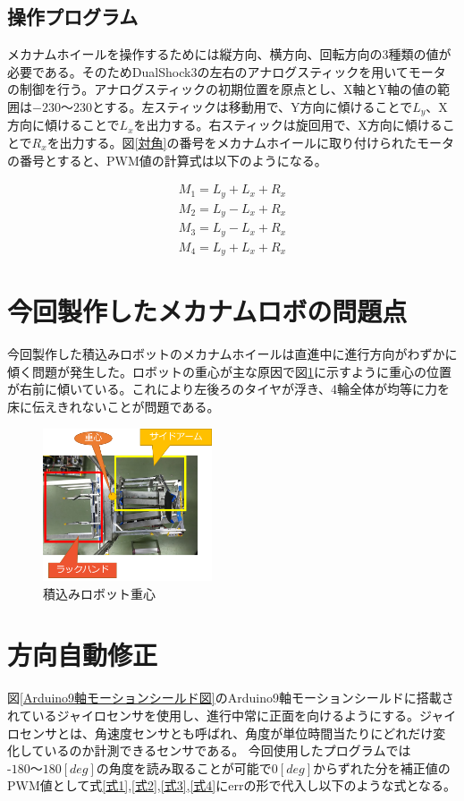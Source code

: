 \documentclass[twocolumn,11pt]{sotsuken_abst}
\begin{document}
	\subsection{操作プログラム}
	メカナムホイールを操作するためには縦方向、横方向、回転方向の3種類の値が必要である。そのためDualShock3の左右のアナログスティックを用いてモータの制御を行う。アナログスティックの初期位置を原点とし、X軸とY軸の値の範囲は$-230～230$とする。左スティックは移動用で、Y方向に傾けることで$L_y$、X方向に傾けることで$L_x$を出力する。右スティックは旋回用で、X方向に傾けることで$R_x$を出力する。図\ref{対角}の番号をメカナムホイールに取り付けられたモータの番号とすると、PWM値の計算式は以下のようになる。

	\begin{eqnarray}
	M_1 = L_y + L_x + R_x
	\label{式1}
	\\
	M_2 = L_y - L_x + R_x
	\label{式2}
	\\
	M_3 = L_y - L_x + R_x
	\label{式3}
	\\
	M_4 = L_y + L_x + R_x
	\label{式4}
	\end{eqnarray}

\section{今回製作したメカナムロボの問題点}
今回製作した積込みロボットのメカナムホイールは直進中に進行方向がわずかに傾く問題が発生した。ロボットの重心が主な原因で図\ref{積込みロボット重心}に示すように重心の位置が右前に傾いている。これにより左後ろのタイヤが浮き、4輪全体が均等に力を床に伝えきれないことが問題である。

\begin{figure}[htp]
	\begin{center}
		\includegraphics[width=50mm]{Image/積込みロボット重心.png}
		\caption{積込みロボット重心}
		\label{積込みロボット重心}
	\end{center}
\end{figure}

\section{方向自動修正}
図\ref{Arduino9軸モーションシールド図}のArduino9軸モーションシールドに搭載されているジャイロセンサを使用し、進行中常に正面を向けるようにする。ジャイロセンサとは、角速度センサとも呼ばれ、角度が単位時間当たりにどれだけ変化しているのか計測できるセンサである。
今回使用したプログラムでは$‐180～180[deg]$の角度を読み取ることが可能で$0[deg]$からずれた分を補正値のPWM値として式\ref{式1},\ref{式2},\ref{式3},\ref{式4}にerrの形で代入し以下のような式となる。
\end{document}
